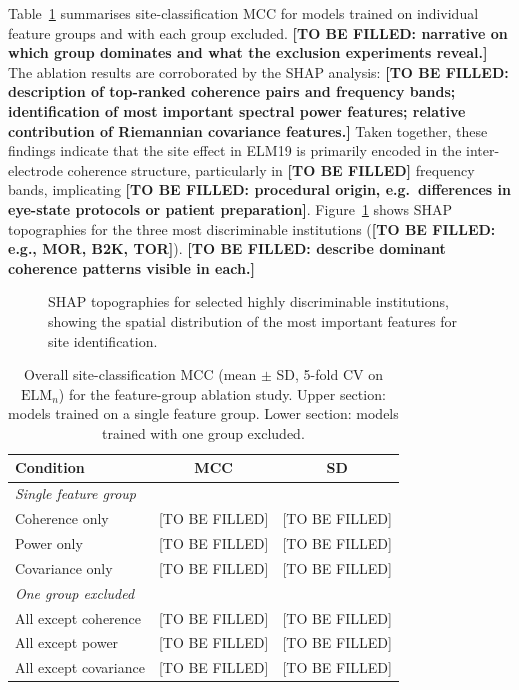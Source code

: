 \documentclass[preprint,12pt]{elsarticle}
\begin{document}
Table~\ref{tab:ablation} summarises site-classification MCC for models
trained on individual feature groups and with each group excluded.
\textbf{[TO BE FILLED: narrative on which group dominates and what
the exclusion experiments reveal.]}
The ablation results are corroborated by the SHAP analysis:
\textbf{[TO BE FILLED: description of top-ranked coherence pairs and
frequency bands; identification of most important spectral power
features; relative contribution of Riemannian covariance features.]}
Taken together, these findings indicate that the site effect in
ELM19 is primarily encoded in the inter-electrode coherence structure,
particularly in \textbf{[TO BE FILLED]} frequency bands, implicating
\textbf{[TO BE FILLED: procedural origin, e.g.\ differences in
eye-state protocols or patient preparation]}.
Figure~\ref{fig:shap_topo} shows SHAP topographies for the three most
discriminable institutions (\textbf{[TO BE FILLED: e.g., MOR, B2K,
TOR]}).
\textbf{[TO BE FILLED: describe dominant coherence patterns visible in
each.]}

\begin{figure}[htbp]
  \centering
  \caption{SHAP topographies for selected highly discriminable
    institutions, showing the spatial distribution of the most
    important features for site identification.}
  \label{fig:shap_topo}
\end{figure}

\begin{table}[htbp]
  \centering
  \caption{Overall site-classification MCC (mean $\pm$ SD, 5-fold CV
    on $\mathrm{ELM}_n$) for the feature-group ablation study.
    Upper section: models trained on a single feature group.
    Lower section: models trained with one group excluded.}
  \label{tab:ablation}
  \begin{tabular}{lcc}
    \toprule
    \textbf{Condition} & \textbf{MCC} & \textbf{SD} \\
    \midrule
    \multicolumn{3}{l}{\textit{Single feature group}} \\
    \quad Coherence only  & [TO BE FILLED] & [TO BE FILLED] \\
    \quad Power only      & [TO BE FILLED] & [TO BE FILLED] \\
    \quad Covariance only & [TO BE FILLED] & [TO BE FILLED] \\
    \midrule
    \multicolumn{3}{l}{\textit{One group excluded}} \\
    \quad All except coherence  & [TO BE FILLED] & [TO BE FILLED] \\
    \quad All except power      & [TO BE FILLED] & [TO BE FILLED] \\
    \quad All except covariance & [TO BE FILLED] & [TO BE FILLED] \\
    \bottomrule
  \end{tabular}
\end{table}
\end{document}
